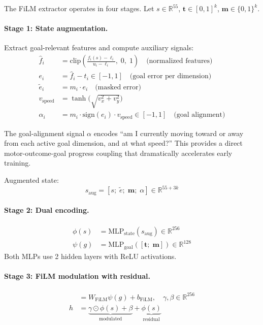 \documentclass[11pt,a4paper]{article}
\begin{document}
The FiLM extractor operates in four stages.
Let $s \in \mathbb{R}^{55}$, $\mathbf{t} \in [0,1]^k$, $\mathbf{m} \in \{0,1\}^k$.

\paragraph{Stage 1: State augmentation.}
Extract goal-relevant features and compute auxiliary signals:
\begin{align}
\hat{f}_i &= \text{clip}\!\left(\frac{f_i(s) - \ell_i}{u_i - \ell_i},\; 0,\; 1\right) \quad \text{(normalized features)} \label{eq:norm-feats} \\
e_i &= \hat{f}_i - t_i \in [-1, 1] \quad \text{(goal error per dimension)} \label{eq:goal-error-vec} \\
\tilde{e}_i &= m_i \cdot e_i \quad \text{(masked error)} \label{eq:masked-error} \\
v_{\text{speed}} &= \tanh\!\bigl(\sqrt{v_x^2 + v_y^2}\bigr) \label{eq:speed} \\
\alpha_i &= m_i \cdot \text{sign}(e_i) \cdot v_{\text{speed}} \in [-1, 1] \quad \text{(goal alignment)} \label{eq:goal-alignment}
\end{align}

The goal-alignment signal $\alpha$ encodes ``am I currently moving toward or away from each active goal dimension, and at what speed?''
This provides a direct motor-outcome-goal progress coupling that dramatically accelerates early training.

Augmented state:
\begin{equation}
s_{\text{aug}} = [s;\; \tilde{e};\; \mathbf{m};\; \alpha] \in \mathbb{R}^{55 + 3k}
\end{equation}

\paragraph{Stage 2: Dual encoding.}
\begin{align}
\phi(s) &= \text{MLP}_{\text{state}}(s_{\text{aug}}) \in \mathbb{R}^{256} \label{eq:state-enc} \\
\psi(g) &= \text{MLP}_{\text{goal}}([\mathbf{t};\; \mathbf{m}]) \in \mathbb{R}^{128} \label{eq:goal-enc}
\end{align}
Both MLPs use 2 hidden layers with ReLU activations.

\paragraph{Stage 3: FiLM modulation with residual.}
\begin{align}
[\gamma;\; \beta] &= W_{\text{FiLM}} \psi(g) + b_{\text{FiLM}}, \quad \gamma, \beta \in \mathbb{R}^{256} \label{eq:film-params} \\
h &= \underbrace{\gamma \odot \phi(s) + \beta}_{\text{modulated}} + \underbrace{\phi(s)}_{\text{residual}} \label{eq:film-modulation}
\end{align}
\end{document}
